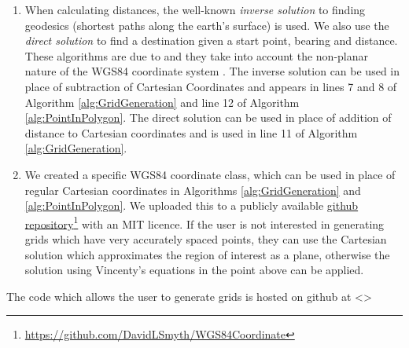 \begin{enumerate}
    \item When calculating distances, the well-known \textit{inverse solution} to finding geodesics (shortest paths along the earth's surface) is used. We also use the \textit{direct solution} to find a destination given a start point, bearing and distance. These algorithms are due to \citeauthor{Vincenty1975DirectEquations} and they take into account the non-planar nature of the WGS84 coordinate system \cite{Vincenty1975DirectEquations}. The inverse solution can be used in place of subtraction of Cartesian Coordinates and appears in lines 7 and 8 of Algorithm \ref{alg:GridGeneration} and line 12 of Algorithm \ref{alg:PointInPolygon}. The direct solution can be used in place of addition of distance to Cartesian coordinates and is used in line 11 of Algorithm \ref{alg:GridGeneration}.
    
    \item We created a specific WGS84 coordinate class, which can be used in place of regular Cartesian coordinates in Algorithms \ref{alg:GridGeneration} and \ref{alg:PointInPolygon}. We uploaded this to a publicly available  \href{https://github.com/DavidLSmyth/WGS84Coordinate}{github repository}\footnote{\href {https://github.com/DavidLSmyth/WGS84Coordinate}{https://github.com/DavidLSmyth/WGS84Coordinate}} with an MIT licence. If the user is not interested in generating grids which have very accurately spaced points, they can use the Cartesian solution which approximates the region of interest as a plane, otherwise the solution using Vincenty's equations in the point above can be applied.
\end{enumerate}

The code which allows the user to generate grids is hosted on github at <> 

